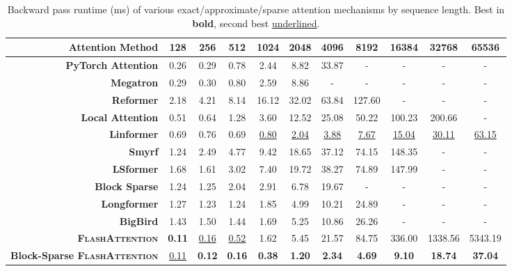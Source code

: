 \documentclass{article}
\newcommand{\sysname}{\textsc{FlashAttention}\xspace}
\begin{document}
\begin{table}
\centering
\scriptsize
\captionsetup{font=small}
\caption{Backward pass runtime (ms) of various exact/approximate/sparse attention mechanisms by sequence length. Best in \textbf{bold}, second best \underline{underlined}.}
\begin{tabular}{@{}r|cccccccccc@{}}
\toprule
\textbf{Attention Method} & 128 & 256 & 512 & 1024 & 2048 & 4096 & 8192 & 16384 & 32768 & 65536 \\
\hline
\textbf{PyTorch Attention} & 0.26 & 0.29 & 0.78 & 2.44 & 8.82 & 33.87 & - & - & - & - \\
\textbf{Megatron} & 0.29 & 0.30 & 0.80 & 2.59 & 8.86 & - & - & - & - & - \\
\hline
\textbf{Reformer} & 2.18 & 4.21 & 8.14 & 16.12 & 32.02 & 63.84 & 127.60 & - & - & - \\
\textbf{Local Attention} & 0.51 & 0.64 & 1.28 & 3.60 & 12.52 & 25.08 & 50.22 & 100.23 & 200.66 & - \\
\textbf{Linformer} & 0.69 & 0.76 & 0.69 & \underline{0.80} & \underline{2.04} & \underline{3.88} & \underline{7.67} & \underline{15.04} & \underline{30.11} & \underline{63.15} \\
\textbf{Smyrf} & 1.24 & 2.49 & 4.77 & 9.42 & 18.65 & 37.12 & 74.15 & 148.35 & - & - \\
\textbf{LSformer} & 1.68 & 1.61 & 3.02 & 7.40 & 19.72 & 38.27 & 74.89 & 147.99 & - & - \\
\hline
\textbf{Block Sparse} & 1.24 & 1.25 & 2.04 & 2.91 & 6.78 & 19.67 & - & - & - & - \\
\textbf{Longformer} & 1.27 & 1.23 & 1.24 & 1.85 & 4.99 & 10.21 & 24.89 & - & - & - \\
\textbf{BigBird} & 1.43 & 1.50 & 1.44 & 1.69 & 5.25 & 10.86 & 26.26 & - & - & - \\
\hline
\textbf{\sysname} & \textbf{0.11} & \underline{0.16} & \underline{0.52} & 1.62 & 5.45 & 21.57 & 84.75 & 336.00 & 1338.56 & 5343.19 \\
\textbf{Block-Sparse \sysname} & \underline{0.11} & \textbf{0.12} & \textbf{0.16} & \textbf{0.38} & \textbf{1.20} & \textbf{2.34} & \textbf{4.69} & \textbf{9.10} & \textbf{18.74} & \textbf{37.04} \\
\bottomrule
\end{tabular}
\label{tab:backward_pass}
\end{table}
\end{document}
